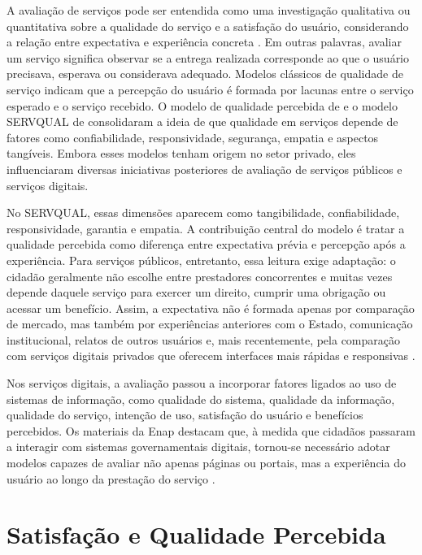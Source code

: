 A avaliação de serviços pode ser entendida como uma investigação qualitativa ou quantitativa sobre a qualidade do serviço e a satisfação do usuário, considerando a relação entre expectativa e experiência concreta \cite{lima2020m1}. Em outras palavras, avaliar um serviço significa observar se a entrega realizada corresponde ao que o usuário precisava, esperava ou considerava adequado. Modelos clássicos de qualidade de serviço indicam que a percepção do usuário é formada por lacunas entre o serviço esperado e o serviço recebido. O modelo de qualidade percebida de  e o modelo SERVQUAL de  consolidaram a ideia de que qualidade em serviços depende de fatores como confiabilidade, responsividade, segurança, empatia e aspectos tangíveis. Embora esses modelos tenham origem no setor privado, eles influenciaram diversas iniciativas posteriores de avaliação de serviços públicos e serviços digitais.

No SERVQUAL, essas dimensões aparecem como tangibilidade, confiabilidade, responsividade, garantia e empatia. A contribuição central do modelo é tratar a qualidade percebida como diferença entre expectativa prévia e percepção após a experiência. Para serviços públicos, entretanto, essa leitura exige adaptação: o cidadão geralmente não escolhe entre prestadores concorrentes e muitas vezes depende daquele serviço para exercer um direito, cumprir uma obrigação ou acessar um benefício. Assim, a expectativa não é formada apenas por comparação de mercado, mas também por experiências anteriores com o Estado, comunicação institucional, relatos de outros usuários e, mais recentemente, pela comparação com serviços digitais privados que oferecem interfaces mais rápidas e responsivas \cite{parasuraman1988,lima2020m2}.

Nos serviços digitais, a avaliação passou a incorporar fatores ligados ao uso de sistemas de informação, como qualidade do sistema, qualidade da informação, qualidade do serviço, intenção de uso, satisfação do usuário e benefícios percebidos. Os materiais da Enap destacam que, à medida que cidadãos passaram a interagir com sistemas governamentais digitais, tornou-se necessário adotar modelos capazes de avaliar não apenas páginas ou portais, mas a experiência do usuário ao longo da prestação do serviço \cite{lima2020m2,delone2003,pedrosa2019}.

\section{Satisfação e Qualidade Percebida}
\label{sec:2.3}


